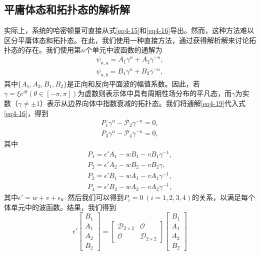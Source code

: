 \subsection{平庸体态和拓扑态的解析解}

实际上，系统的哈密顿量可直接从式\ref{eq4-15}和\ref{eq4-16}导出。然而，这种方法难以区分平庸体态和拓扑态。在此，我们使用一种直接方法，通过获得解析解来讨论拓扑态的存在。我们使用第\(n\)个单元中波函数的通解为\cite{i5}
\begin{equation}\label{eq4-19}
    \begin{split}
        \psi_{n,a}=A_{1}\gamma^{n}+A_{2}\gamma^{-n},\\
        \psi_{n,b}=B_{1}\gamma^{n}+B_{2}\gamma^{-n},
    \end{split}
\end{equation}
其中\(\{A_{1},A_{2},B_{1},B_{2}\}\)是正向和反向平面波的幅值系数。因此，若\(\gamma=\xi e^{i\theta}(\theta\in[-\pi,\pi])\)为虚数则表示体中具有周期性场分布的平凡态，而\(\gamma\)为实数（\(\gamma\neq\pm1\)）表示从边界向体中指数衰减的拓扑态。我们将通解\ref{eq4-19}代入式\ref{eq4-16}，得到
\begin{equation}\label{eq4-20}
    \begin{split}
        {P}_{1}\gamma^{n}-\mathcal{P}_{2}\gamma^{-n}=0,\\
        {P}_{3}\gamma^{n}-\mathcal{P}_{4}\gamma^{-n}=0,
    \end{split}
\end{equation}
其中
\begin{equation}\label{eq4-21}
    \begin{split}
        {P}_{1}=\epsilon'A_{1}-wB_{1}-vB_{1}\gamma^{-1},\\
        {P}_{2}=\epsilon'A_{2}-wB_{2}-vB_{2}\gamma,\\
        {P}_{3}=\epsilon'B_{1}-wA_{1}-vA_{1}\gamma^{-1},\\
        {P}_{4}=\epsilon'B_{2}-wA_{2}-vA_{2}\gamma^{-1},
    \end{split}
\end{equation}
其中\(\epsilon' = w + v + \epsilon\)。然后我们可以得到\({P}_{i}=0\ (i = 1,2,3,4)\)的关系，以满足每个体单元中的波函数。结果，我们得到
\begin{equation}\label{eq4-22}
    \epsilon'\begin{bmatrix}B_{1}\\A_{1}\\A_{2}\\B_{2}\end{bmatrix}=\begin{bmatrix}\mathcal{D}_{2\times2}&\mathcal{O}\\\mathcal{O}&\mathcal{D}_{2\times2}\end{bmatrix}\begin{bmatrix}B_{1}\\A_{1}\\A_{2}\\B_{2}\end{bmatrix}
\end{equation}

